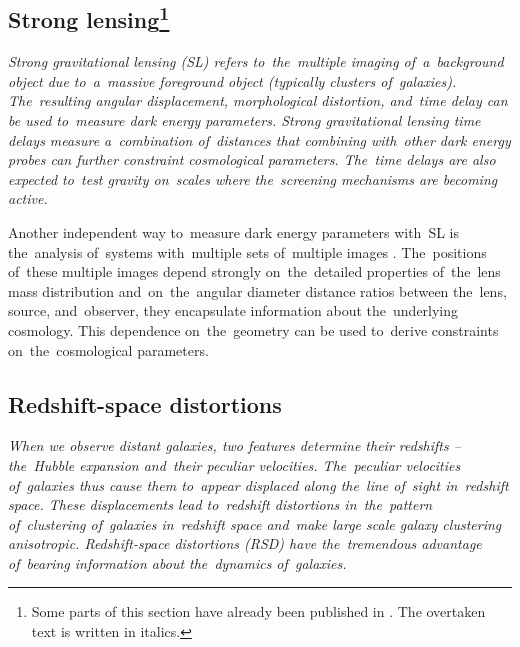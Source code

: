 \subsection[Strong lensing]{Strong lensing\footnote{\label{ftn2}Some parts of this section have already been published in \textcite{mastersthesis_vrastil}. The overtaken text is written in italics.}}
\label{ssec:SL}
{\itshape
Strong gravitational lensing (SL) refers to~the~multiple imaging of~a~background object due to~a~massive foreground object (typically clusters of~galaxies). The~resulting angular displacement, morphological distortion, and~time delay can be used to~measure dark energy parameters. Strong gravitational lensing time delays measure a~combination of~distances that combining with~other dark energy probes can further constraint cosmological parameters. The~time delays are also expected to~test gravity on~scales where the~screening mechanisms are becoming active.

Another independent way to~measure dark energy parameters with~SL is the~analysis of~systems with~multiple sets of~multiple images \textcite{SL_in_CLGs}. The~positions of~these multiple images depend strongly on~the~detailed properties of~the~lens mass distribution and~on~the~angular diameter distance ratios between the~lens, source, and~observer, they encapsulate information about the~underlying cosmology. This dependence on~the~geometry can be used to~derive constraints on~the~cosmological parameters.
}
\subsection[Redshift-space distortions]{Redshift-space distortions}
\label{sec:rsd}
{\itshape
When we observe distant galaxies, two features determine their redshifts -- the~Hubble expansion and~their peculiar velocities. The~peculiar velocities of~galaxies thus cause them to~appear displaced along the~line of~sight in~redshift space. These displacements lead to~redshift distortions in~the~pattern of~clustering of~galaxies in~redshift space and~make large scale galaxy clustering anisotropic. Redshift-space distortions (RSD) have the~tremendous advantage of~bearing information about the~dynamics of~galaxies.}

